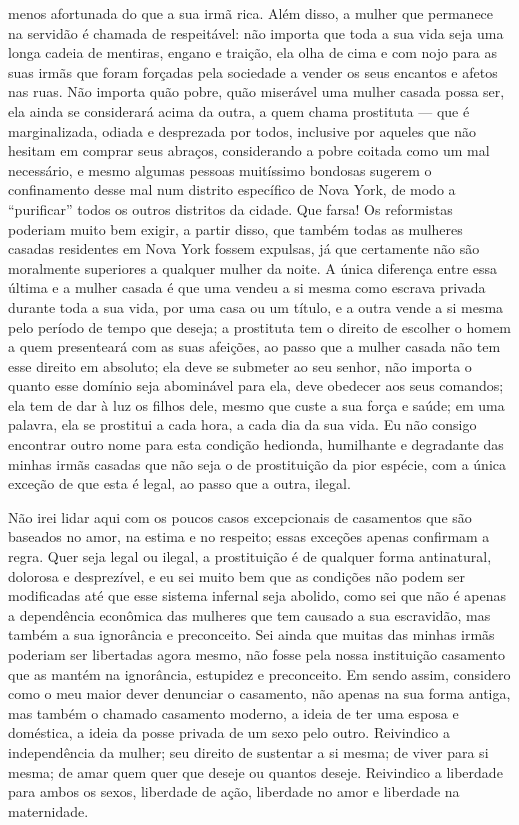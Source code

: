 menos afortunada do que a sua irmã rica. Além disso, a mulher que
permanece na servidão é chamada de respeitável: não importa que toda a
sua vida seja uma longa cadeia de mentiras, engano e traição, ela olha
de cima e com nojo para as suas irmãs que foram forçadas pela sociedade
a vender os seus encantos e afetos nas ruas. Não importa quão pobre,
quão miserável uma mulher casada possa ser, ela ainda se considerará
acima da outra, a quem chama prostituta --- que é marginalizada, odiada e
desprezada por todos, inclusive por aqueles que não hesitam em comprar
seus abraços, considerando a pobre coitada como um mal necessário, e
mesmo algumas pessoas muitíssimo bondosas sugerem o confinamento desse
mal num distrito específico de Nova York, de modo a ``purificar'' todos
os outros distritos da cidade. Que farsa! Os reformistas poderiam muito
bem exigir, a partir disso, que também todas as mulheres casadas
residentes em Nova York fossem expulsas, já que certamente não são
moralmente superiores a qualquer mulher da noite. A única diferença
entre essa última e a mulher casada é que uma vendeu a si mesma como
escrava privada durante toda a sua vida, por uma casa ou um título, e a
outra vende a si mesma pelo período de tempo que deseja; a prostituta tem o
direito de escolher o homem a quem presenteará com as suas afeições, ao
passo que a mulher casada não tem esse direito em absoluto; ela deve se
submeter ao seu senhor, não importa o quanto esse domínio seja
abominável para ela, deve obedecer aos seus comandos; ela tem de
dar à luz os filhos dele, mesmo que custe a sua força e saúde; em uma palavra,
ela se prostitui a cada hora, a cada dia da sua vida. Eu não
consigo encontrar outro nome para esta condição hedionda, humilhante e
degradante das minhas irmãs casadas que não seja o de prostituição da pior
espécie, com a única exceção de que esta é legal, ao passo que a outra, ilegal.

Não irei lidar aqui com os poucos casos excepcionais de casamentos que
são baseados no amor, na estima e no respeito; essas exceções apenas
confirmam a regra. Quer seja legal ou ilegal, a prostituição é de
qualquer forma antinatural, dolorosa e desprezível, e eu sei muito bem
que as condições não podem ser modificadas até que esse sistema infernal
seja abolido, como sei que não é apenas a dependência econômica das
mulheres que tem causado a sua escravidão, mas também a sua ignorância e
preconceito. Sei ainda que muitas das minhas irmãs poderiam ser
libertadas agora mesmo, não fosse pela nossa instituição casamento que
as mantém na ignorância, estupidez e preconceito. Em sendo assim,
considero como o meu maior dever denunciar o casamento, não apenas na
sua forma antiga, mas também o chamado casamento moderno, a ideia de ter
uma esposa e doméstica, a ideia da posse privada de um sexo pelo outro.
Reivindico a independência da mulher; seu direito de sustentar a si
mesma; de viver para si mesma; de amar quem quer que deseje ou quantos
deseje. Reivindico a liberdade para ambos os sexos, liberdade de ação,
liberdade no amor e liberdade na maternidade.

